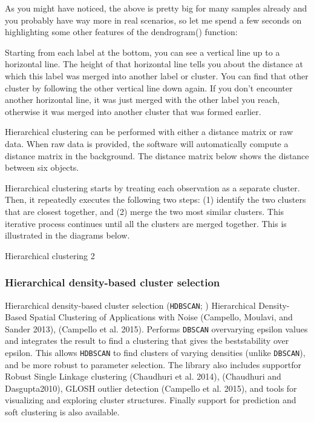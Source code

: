 \documentclass[fleqn,usenatbib]{mnras}
\begin{document}
As you might have noticed, the above is pretty big for many samples already and you
probably have way more in real scenarios, so let me spend a few seconds on highlighting
some other features of the dendrogram() function:


Starting from each label at the bottom, you can see a vertical line up to a
horizontal line. The height of that horizontal line tells you about the distance
at which this label was merged into another label or cluster. You can find that
other cluster by following the other vertical line down again. If you don't
encounter another horizontal line, it was just merged with the other label
you reach, otherwise it was merged into another cluster that was formed earlier.

Hierarchical clustering can be performed with either a distance matrix or raw data.
When raw data is provided, the software will automatically compute a distance
matrix in the background. The distance matrix below shows the distance between
six objects.

Hierarchical clustering starts by treating each observation as a separate cluster.
Then, it repeatedly executes the following two steps: (1) identify the two
clusters that are closest together, and (2) merge the two most similar clusters.
This iterative process continues until all the clusters are merged together.
This is illustrated in the diagrams below.

Hierarchical clustering 2

\subsubsection{Hierarchical density-based cluster selection}
\label{sec:hdbscan}

Hierarchical density-based cluster selection (\texttt{HDBSCAN}; \citealp{McInnes:2017})
Hierarchical Density-Based Spatial Clustering of Applications with Noise (Campello,
Moulavi, and Sander 2013), (Campello et al. 2015). Performs \texttt{DBSCAN} overvarying
epsilon values and integrates the result to find a clustering that gives the beststability
over epsilon. This allows \texttt{HDBSCAN} to find clusters of varying densities
(unlike \texttt{DBSCAN}), and be more robust to parameter selection. The library also
includes supportfor Robust Single Linkage clustering (Chaudhuri et al. 2014),
(Chaudhuri and Dasgupta2010), GLOSH outlier detection (Campello et al. 2015), and
tools for visualizing and exploring cluster structures. Finally support for prediction
and soft clustering is also available.
\end{document}
